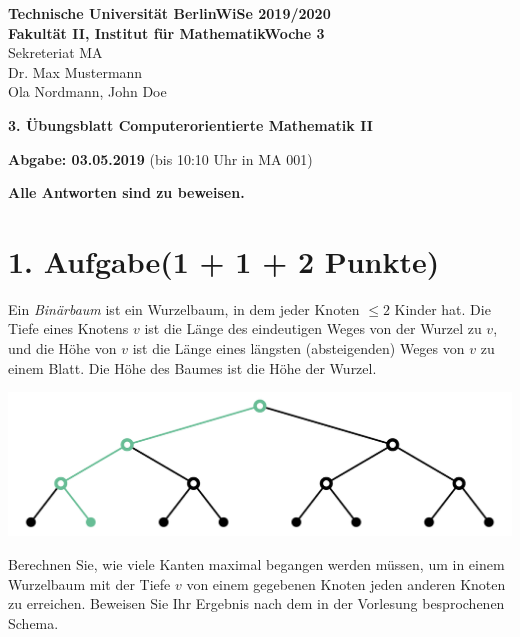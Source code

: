 \documentclass[11pt, a4paper]{article}
\begin{document}
\textbf{Technische Universität Berlin}\hfill\textbf{WiSe 2019/2020} \\
\textbf{Fakultät II, Institut für Mathematik}\hfill\textbf{Woche 3} \\
Sekreteriat MA \\
Dr. Max Mustermann \\
Ola Nordmann, John Doe

\vspace{.5cm}
\raggedright

\begin{center}
    {
        \Large
        \textbf{3. Übungsblatt Computerorientierte Mathematik II}
    }
    \large
    
    \vspace{.25cm}
    
    \textbf{Abgabe: 03.05.2019} (bis 10:10 Uhr in MA 001)
    
    \vspace{.25cm}
    
    \textbf{Alle Antworten sind zu beweisen.}
\end{center}

\section*{1. Aufgabe\hfill\textnormal{\normalsize (1 + 1 + 2 Punkte)}}
Ein \emph{Binärbaum} ist ein Wurzelbaum, in dem jeder Knoten $\leq 2$ Kinder hat.
Die Tiefe eines Knotens $v$ ist die Länge des eindeutigen Weges von der Wurzel
zu $v$, und die Höhe von $v$ ist die Länge eines längsten (absteigenden) Weges
von $v$ zu einem Blatt. Die Höhe des Baumes ist die Höhe der Wurzel.

\vspace{6mm}

\begin{center}
    \includegraphics[width=.9\textwidth]{../assets/graph}
\end{center}

Berechnen Sie, wie viele Kanten maximal begangen werden müssen, um in einem Wurzelbaum mit der Tiefe $v$ von einem gegebenen Knoten jeden anderen Knoten zu erreichen. Beweisen Sie Ihr Ergebnis nach dem in der Vorlesung besprochenen Schema.
\end{document}
